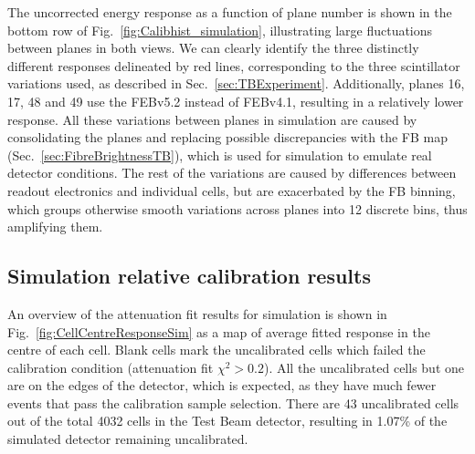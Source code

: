 The uncorrected energy response as a function of plane number is shown in the bottom row of Fig.~\ref{fig:Calibhist_simulation}, illustrating large fluctuations between planes in both views. We can clearly identify the three distinctly different responses delineated by red lines, corresponding to the three scintillator variations used, as described in Sec.~\ref{sec:TBExperiment}. Additionally, planes 16, 17, 48 and 49 use the \gls{FEB}v5.2 instead of \gls{FEB}v4.1, resulting in a relatively lower response. All these variations between planes in simulation are caused by consolidating the planes and replacing possible discrepancies with the \gls{FB} map (Sec.~\ref{sec:FibreBrightnessTB}), which is used for simulation to emulate real detector conditions. The rest of the variations are caused by differences between readout electronics and individual cells, but are exacerbated by the \gls{FB} binning, which groups otherwise smooth variations across planes into 12 discrete bins, thus amplifying them.

\subsection*{Simulation relative calibration results}

An overview of the attenuation fit results for simulation is shown in Fig.~\ref{fig:CellCentreResponseSim} as a map of average fitted response in the centre of each cell. Blank cells mark the uncalibrated cells which failed the calibration condition (attenuation fit $\chi^2>0.2$). All the uncalibrated cells but one are on the edges of the detector, which is expected, as they have much fewer events that pass the calibration sample selection. There are 43 uncalibrated cells out of the total 4032 cells in the Test Beam detector, resulting in 1.07\% of the simulated detector remaining uncalibrated.

